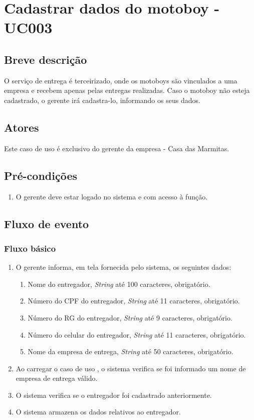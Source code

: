 \chapter{Cadastrar dados do motoboy - UC003} \label{uc003}

\section{Breve descrição}

O serviço de entrega é terceirizado, onde os motoboys são vinculados a uma empresa e recebem apenas pelas entregas realizadas. Caso o motoboy não esteja cadastrado, o gerente irá cadastra-lo, informando os seus dados.

\section{Atores}

Este caso de uso é exclusivo do gerente da empresa - Casa das Marmitas.

\section{Pré-condições}

\begin{enumerate}
	\item O gerente deve estar logado no sistema e com acesso à função.
\end{enumerate}

\section{Fluxo de evento}

\subsection{Fluxo básico}

\begin{enumerate}
	\item O gerente informa, em tela fornecida pelo sistema, os seguintes dados:
	\begin{enumerate}
		\item Nome do entregador, \emph{String} até 100 caracteres, obrigatório.
		\item Número do CPF do entregador, \emph{String} até 11 caracteres, obrigatório.
		\item Número do RG do entregador, \emph{String} até 9 caracteres, obrigatório.
		\item Número do celular do entregador, \emph{String} até 11 caracteres, obrigatório.	
		\item Nome da empresa de entrega, \emph{String} até 50 caracteres, obrigatório.
	\end{enumerate}
	\item Ao carregar o caso de uso , o sistema verifica se foi informado um nome de empresa de entrega válido.
	\item O sistema verifica se o entregador foi cadastrado anteriormente.
	\item O sistema armazena os dados relativos ao entregador.
\end{enumerate}

